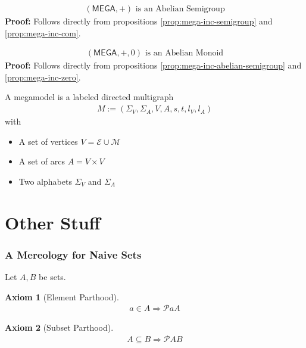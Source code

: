\documentclass[runningheads,a4paper]{llncs}
\newtheorem{axiom}{Axiom}
\newcommand{\MEGA}{\mathsf{MEGA}}
\begin{document}
\begin{proposition}
\label{prop:mega-inc-abelian-semigroup}
\begin{align}
(\MEGA,+) \text{ is an Abelian Semigroup}
\end{align}
\textbf{Proof:}
Follows directly from propositions \ref{prop:mega-inc-semigroup} and \ref{prop:mega-inc-com}.
\end{proposition}

\begin{proposition}
\label{prop:mega-inc-abelian-monoid}
\begin{align}
(\MEGA,+,0) \text{ is an Abelian Monoid}
\end{align}
\textbf{Proof:}
Follows directly from propositions \ref{prop:mega-inc-abelian-semigroup} and \ref{prop:mega-inc-zero}.
\end{proposition}


\begin{definition}[Megamodel]
A megamodel is a labeled directed multigraph
\begin{align}
M := (\Sigma_V, \Sigma_A, V, A, s, t, l_V, l_A)
\end{align}
with
\begin{itemize}

\item A set of vertices $V = \mathscr{E} \cup \mathscr{M}$
\item A set of arcs $A = V \times V$
\item Two alphabets $\Sigma_V$ and $\Sigma_A$


\end{itemize}
\end{definition}


\section{Other Stuff}

\subsubsection{A Mereology for Naive Sets}
Let $A,B$ be sets.
\begin{axiom}[Element Parthood]
\begin{align}
a \in A \Rightarrow \mathcal{P} a A
\end{align}
\end{axiom}

\begin{axiom}[Subset Parthood]
\begin{align}
A \subseteq B \Rightarrow \mathcal{P} A B
\end{align}
\end{axiom}
\end{document}
